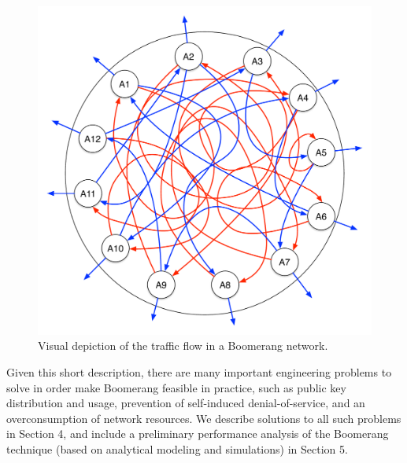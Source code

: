 \begin{figure}[ht!]
\begin{center}
\includegraphics[scale=0.25]{./images/boomerang_net.pdf}
\caption{Visual depiction of the traffic flow in a Boomerang network.}
\label{fig:boomerang_net}
\end{center}
\end{figure}

Given this short description, there are many important engineering problems to solve in order make Boomerang feasible in practice, such as public key distribution and usage, prevention of self-induced denial-of-service, and an overconsumption of network resources. We describe solutions to all such problems in Section 4, and include a preliminary performance analysis of the Boomerang technique (based on analytical modeling and simulations) in Section 5. 
